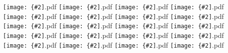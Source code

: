 \documentclass[12pt,a4paper]{article}
\newcommand{\pdffig}[2][0.5]{\texttt{[image: \{\#2]}.pdf}}
\begin{document}
\pdffig[0.5]{Lin_Regression_SthAfr_tsfc_w_high}
\pdffig[0.5]{Lin_Regression_SthAfr_tsfc_w_low}
\pdffig[0.5]{Lin_Regression_SthSthAm_tsfc_u_hig}
\pdffig[0.5]{Lin_Regression_SthSthAm_tsfc_u_low}
\pdffig[0.5]{Lin_Regression_SthSthAm_tsfc_v_high}
\pdffig[0.5]{Lin_Regression_SthSthAm_tsfc_v_low}
\pdffig[0.5]{Lin_Regression_SthSthAm_tsfc_w_high}
\pdffig[0.5]{Lin_Regression_SthSthAm_tsfc_w_low}
\pdffig[0.5]{Lin_Regression_TropAfr_tsfc_u_hig}
\pdffig[0.5]{Lin_Regression_TropAfr_tsfc_u_low}
\pdffig[0.5]{Lin_Regression_TropAfr_tsfc_v_high}
\pdffig[0.5]{Lin_Regression_TropAfr_tsfc_v_low}
\pdffig[0.5]{Lin_Regression_TropAfr_tsfc_w_high}
\pdffig[0.5]{Lin_Regression_TropAfr_tsfc_w_low}
\pdffig[0.5]{Lin_Regression_TropSthAm_tsfc_u_hig}
\pdffig[0.5]{Lin_Regression_TropSthAm_tsfc_u_low}
\pdffig[0.5]{Lin_Regression_TropSthAm_tsfc_v_high}
\pdffig[0.5]{Lin_Regression_TropSthAm_tsfc_v_low}
\pdffig[0.5]{Lin_Regression_TropSthAm_tsfc_w_high}
\pdffig[0.5]{Lin_Regression_TropSthAm_tsfc_w_low}
\end{document}
